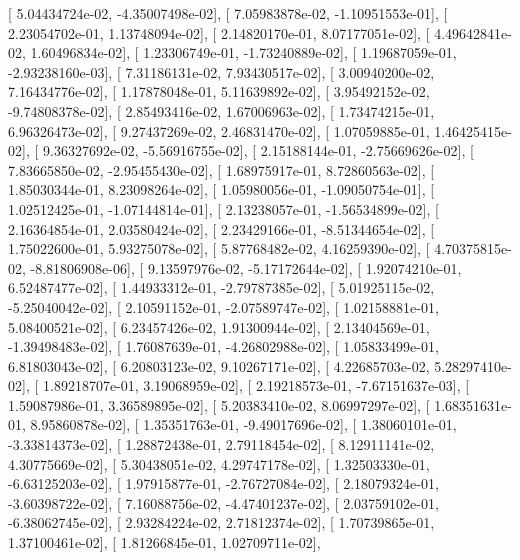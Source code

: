 \documentclass{article}
\begin{document}
       [  5.04434724e-02,  -4.35007498e-02],
       [  7.05983878e-02,  -1.10951553e-01],
       [  2.23054702e-01,   1.13748094e-02],
       [  2.14820170e-01,   8.07177051e-02],
       [  4.49642841e-02,   1.60496834e-02],
       [  1.23306749e-01,  -1.73240889e-02],
       [  1.19687059e-01,  -2.93238160e-03],
       [  7.31186131e-02,   7.93430517e-02],
       [  3.00940200e-02,   7.16434776e-02],
       [  1.17878048e-01,   5.11639892e-02],
       [  3.95492152e-02,  -9.74808378e-02],
       [  2.85493416e-02,   1.67006963e-02],
       [  1.73474215e-01,   6.96326473e-02],
       [  9.27437269e-02,   2.46831470e-02],
       [  1.07059885e-01,   1.46425415e-02],
       [  9.36327692e-02,  -5.56916755e-02],
       [  2.15188144e-01,  -2.75669626e-02],
       [  7.83665850e-02,  -2.95455430e-02],
       [  1.68975917e-01,   8.72860563e-02],
       [  1.85030344e-01,   8.23098264e-02],
       [  1.05980056e-01,  -1.09050754e-01],
       [  1.02512425e-01,  -1.07144814e-01],
       [  2.13238057e-01,  -1.56534899e-02],
       [  2.16364854e-01,   2.03580424e-02],
       [  2.23429166e-01,  -8.51344654e-02],
       [  1.75022600e-01,   5.93275078e-02],
       [  5.87768482e-02,   4.16259390e-02],
       [  4.70375815e-02,  -8.81806908e-06],
       [  9.13597976e-02,  -5.17172644e-02],
       [  1.92074210e-01,   6.52487477e-02],
       [  1.44933312e-01,  -2.79787385e-02],
       [  5.01925115e-02,  -5.25040042e-02],
       [  2.10591152e-01,  -2.07589747e-02],
       [  1.02158881e-01,   5.08400521e-02],
       [  6.23457426e-02,   1.91300944e-02],
       [  2.13404569e-01,  -1.39498483e-02],
       [  1.76087639e-01,  -4.26802988e-02],
       [  1.05833499e-01,   6.81803043e-02],
       [  6.20803123e-02,   9.10267171e-02],
       [  4.22685703e-02,   5.28297410e-02],
       [  1.89218707e-01,   3.19068959e-02],
       [  2.19218573e-01,  -7.67151637e-03],
       [  1.59087986e-01,   3.36589895e-02],
       [  5.20383410e-02,   8.06997297e-02],
       [  1.68351631e-01,   8.95860878e-02],
       [  1.35351763e-01,  -9.49017696e-02],
       [  1.38060101e-01,  -3.33814373e-02],
       [  1.28872438e-01,   2.79118454e-02],
       [  8.12911141e-02,   4.30775669e-02],
       [  5.30438051e-02,   4.29747178e-02],
       [  1.32503330e-01,  -6.63125203e-02],
       [  1.97915877e-01,  -2.76727084e-02],
       [  2.18079324e-01,  -3.60398722e-02],
       [  7.16088756e-02,  -4.47401237e-02],
       [  2.03759102e-01,  -6.38062745e-02],
       [  2.93284224e-02,   2.71812374e-02],
       [  1.70739865e-01,   1.37100461e-02],
       [  1.81266845e-01,   1.02709711e-02],
\end{document}
